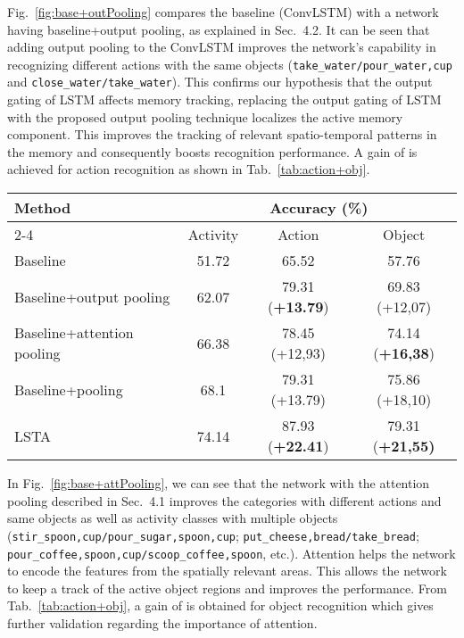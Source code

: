 \documentclass[10pt,twocolumn,letterpaper]{article}
\begin{document}
\begin{matrix*}[r]
Fig.~\ref{fig:base+outPooling} compares the baseline (ConvLSTM) with a network having baseline+output pooling, as explained in Sec.~4.2. It can be seen that adding output pooling to the ConvLSTM improves the network's capability in recognizing different actions with the same objects (\verb+take_water/pour_water,cup+ and \verb+close_water/take_water+). This confirms our hypothesis that the output gating of LSTM affects memory tracking, replacing the output gating of LSTM with the proposed output pooling technique localizes the active memory component. This improves the tracking of relevant spatio-temporal patterns in the memory and consequently boosts recognition performance. A gain of  is achieved for action recognition as shown in Tab.~\ref{tab:action+obj}.
	
	\begin{table*}[t!]\small
	\centering
	\begin{tabular}{|l|c|c|c|}
		\hline
		\multirow{2}{*}{Method} & \multicolumn{3}{c|}{Accuracy (\%)}\\ \cline{2-4}
		& Activity & Action & Object\\ 
		\hline \hline
        Baseline & 51.72 & 65.52 & 57.76\\
        \hline
        Baseline+output pooling & 62.07 & 79.31 ({\bf+13.79}) & 69.83 ({+12,07})\\ \hline
        Baseline+attention pooling & 66.38 & 78.45 (+12,93) & 74.14 ({\bf+16,38}) \\ \hline
        Baseline+pooling & 68.1 & 79.31 (+13.79) & 75.86 (+18,10)\\ \hline
        LSTA & 74.14 & 87.93  ({\bf+22.41}) & 79.31 (\bf+21,55) \\ \hline
	\end{tabular}
	\caption{Detailed ablation analysis on GTEA 61 fixed split. We compute the action and object recognition score by decomposing the action and objects from the predicted activity label.}
	\label{tab:action+obj}
\end{table*}

	In Fig.~\ref{fig:base+attPooling}, we can see that the network with the attention pooling described in Sec.~4.1 improves the categories with different actions and same objects as well as activity classes with multiple objects (\verb+stir_spoon,cup/pour_sugar,spoon,cup+; \verb+put_cheese,bread/take_bread+; \verb+pour_coffee,spoon,cup/scoop_coffee,spoon+, etc.). 
Attention helps the network to encode the features from the spatially relevant areas. This allows the network to keep a track of the active object regions and improves the performance. From Tab.~\ref{tab:action+obj}, a gain of  is obtained for object recognition which gives further validation regarding the importance of attention.  


\end{matrix*}
\end{document}
